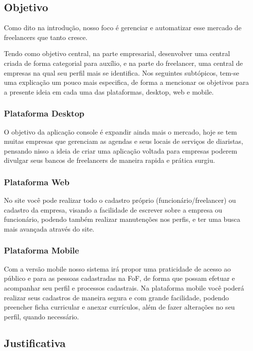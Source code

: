 \subsection{Objetivo}
Como dito na introdução, nosso foco é gerenciar e automatizar esse mercado de freelancers
que tanto cresce. \par
Tendo como objetivo central, na parte empresarial, desenvolver uma central criada de forma
categorial para auxílio, e na parte do freelancer, uma central de empresas na qual seu perfil
mais se identifica. Nos seguintes subtópicos, tem-se uma explicação um pouco mais especifica,
de forma a mencionar os objetivos para a presente ideia em cada uma das plataformas,
desktop, web e mobile.

\subsubsection{Plataforma Desktop}
O objetivo da aplicação console é expandir ainda mais o mercado, hoje
se tem muitas empresas que gerenciam as agendas e seus locais de serviços de diaristas, pensando nisso a ideia de criar uma aplicação voltada para empresas poderem
divulgar seus bancos de freelancers de maneira rapida e prática surgiu.

\subsubsection{Plataforma Web}
No site você pode realizar todo o cadastro próprio (funcionário/freelancer) ou
cadastro da empresa, visando a facilidade de escrever sobre a empresa ou funcionário, podendo também realizar manutenções nos perfis, e ter uma busca mais avançada
através do site.

\subsubsection{Plataforma Mobile}

Com a versão mobile nosso sistema irá propor uma praticidade de acesso ao
público e para as pessoas cadastradas na FoF, de forma que possam efetuar e acompanhar seu perfil e processos cadastrais. Na plataforma mobile você poderá realizar
seus cadastros de maneira segura e com grande facilidade, podendo preencher ficha
curricular e anexar currículos, além de fazer alterações no seu perfil, quando necessário.

\subsection{Justificativa}

